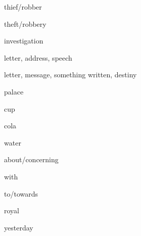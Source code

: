 \begin{flashcard}{\LARGE thief/robber}
\LARGE {}
\end{flashcard}
\begin{flashcard}{\LARGE theft/robbery}
\LARGE {}
\end{flashcard}
\begin{flashcard}{\LARGE investigation}
\LARGE {}
\end{flashcard}
\begin{flashcard}{\LARGE letter, address, speech}
\LARGE {}
\end{flashcard}
\begin{flashcard}{\LARGE letter, message, something written, destiny}
\LARGE {}
\end{flashcard}
\begin{flashcard}{\LARGE palace}
\LARGE {}
\end{flashcard}
\begin{flashcard}{\LARGE cup}
\LARGE {}
\end{flashcard}
\begin{flashcard}{\LARGE cola}
\LARGE {}
\end{flashcard}
\begin{flashcard}{\LARGE water}
\LARGE {}
\end{flashcard}
\begin{flashcard}{\LARGE about/concerning}
\LARGE {}
\end{flashcard}
\begin{flashcard}{\LARGE with}
\LARGE {}
\end{flashcard}
\begin{flashcard}{\LARGE to/towards}
\LARGE {}
\end{flashcard}
\begin{flashcard}{\LARGE royal}
\LARGE {}
\end{flashcard}
\begin{flashcard}{\LARGE yesterday}
\LARGE {}
\end{flashcard}
